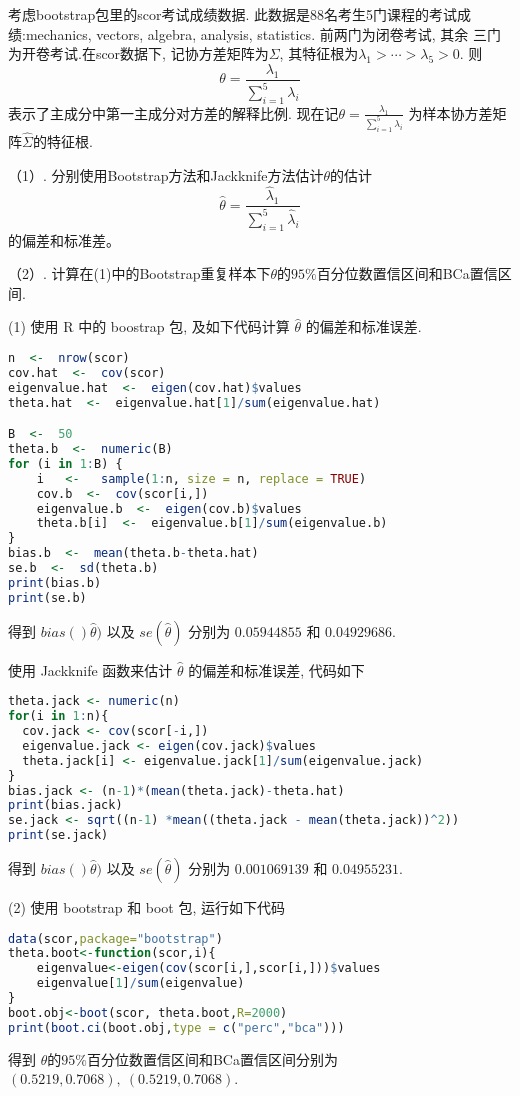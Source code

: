 \begin{problem}
考虑bootstrap包里的scor考试成绩数据. 此数据是88名考生5门课程的考试成绩:mechanics, vectors, algebra, analysis, statistics. 前两门为闭卷考试, 其余
三门为开卷考试.在scor数据下, 记协方差矩阵为$\Sigma$, 其特征根为$\lambda_1>\cdots>\lambda_5>0$. 则
\begin{equation*}
    \theta=\frac{\lambda_1}{\sum_{i=1}^5\lambda_i}
\end{equation*}
表示了主成分中第一主成分对方差的解释比例. 现在记$\theta=\frac{\lambda_1}{\sum_{i=1}^5\lambda_i}$
为样本协方差矩阵$\hat\Sigma$的特征根.

（1）. 分别使用Bootstrap方法和Jackknife方法估计$\theta$的估计
\begin{equation*}
    \hat\theta=\frac{\hat\lambda_1}{\sum_{i=1}^5\hat\lambda_i}
\end{equation*}
的偏差和标准差。

（2）. 计算在(1)中的Bootstrap重复样本下$\theta$的$95\%$百分位数置信区间和BCa置信区间.
\end{problem}

\begin{solution}
(1)
使用 R 中的 boostrap 包, 及如下代码计算 $\hat{\theta}$ 的偏差和标准误差. 

\begin{lstlisting}[language=R] 
n  <-  nrow(scor)
cov.hat  <-  cov(scor)
eigenvalue.hat  <-  eigen(cov.hat)$values
theta.hat  <-  eigenvalue.hat[1]/sum(eigenvalue.hat) 

B  <-  50
theta.b  <-  numeric(B)
for (i in 1:B) {
    i   <-   sample(1:n, size = n, replace = TRUE)
    cov.b  <-  cov(scor[i,])
    eigenvalue.b  <-  eigen(cov.b)$values
    theta.b[i]  <-  eigenvalue.b[1]/sum(eigenvalue.b)
}
bias.b  <-  mean(theta.b-theta.hat)
se.b  <-  sd(theta.b)
print(bias.b)
print(se.b)
\end{lstlisting} 

得到 $bias()\hat{\theta})$ 以及 $se(\hat{\theta})$ 分别为 $0.05944855$ 和 $0.04929686$.

使用 Jackknife 函数来估计 $\hat{\theta}$ 的偏差和标准误差, 代码如下
\begin{lstlisting}[language=R] 
theta.jack <- numeric(n)
for(i in 1:n){
  cov.jack <- cov(scor[-i,])
  eigenvalue.jack <- eigen(cov.jack)$values
  theta.jack[i] <- eigenvalue.jack[1]/sum(eigenvalue.jack)
}
bias.jack <- (n-1)*(mean(theta.jack)-theta.hat)
print(bias.jack)
se.jack <- sqrt((n-1) *mean((theta.jack - mean(theta.jack))^2))
print(se.jack)
\end{lstlisting}
得到 $bias()\hat{\theta})$ 以及 $se(\hat{\theta})$ 分别为 $0.001069139$ 和 $0.04955231$.

(2) 使用 bootstrap 和 boot 包, 运行如下代码
\begin{lstlisting}[language=R] 
data(scor,package="bootstrap")
theta.boot<-function(scor,i){
    eigenvalue<-eigen(cov(scor[i,],scor[i,]))$values
    eigenvalue[1]/sum(eigenvalue)
}
boot.obj<-boot(scor, theta.boot,R=2000)
print(boot.ci(boot.obj,type = c("perc","bca")))
\end{lstlisting}
得到 $\theta$的$95\%$百分位数置信区间和BCa置信区间分别为 $( 0.5219,  0.7068 ) ,\ ( 0.5219,  0.7068 )$.
\end{solution}

